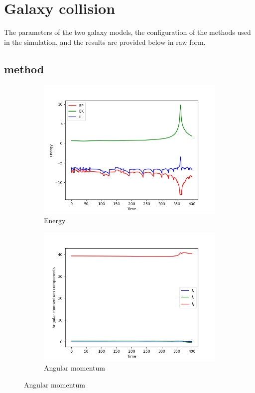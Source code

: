 \section{Galaxy collision}
The parameters of the two galaxy models, the configuration of the methods used in the simulation, and the results are provided below in raw form.
\subsection{\texorpdfstring{\PThreeM{}}{P3M} method}
\begin{figure}[H]
    \centering
    \begin{subfigure}[b]{0.45\textwidth}
        \centering
        \includegraphics[width=\textwidth]{chapters/results/img/p3m-collision/energy.png}
        \caption{Energy}
        \label{fig:physical-quantities-p3m-collision-sub1}
    \end{subfigure}
    \hfill
    \begin{subfigure}[b]{0.45\textwidth}
        \centering
        \includegraphics[width=\textwidth]{chapters/results/img/p3m-collision/angular-momentum.png}
        \caption{Angular momentum}
        \label{fig:physical-quantities-p3m-collision-sub2}
    \end{subfigure}


\end{figure}
